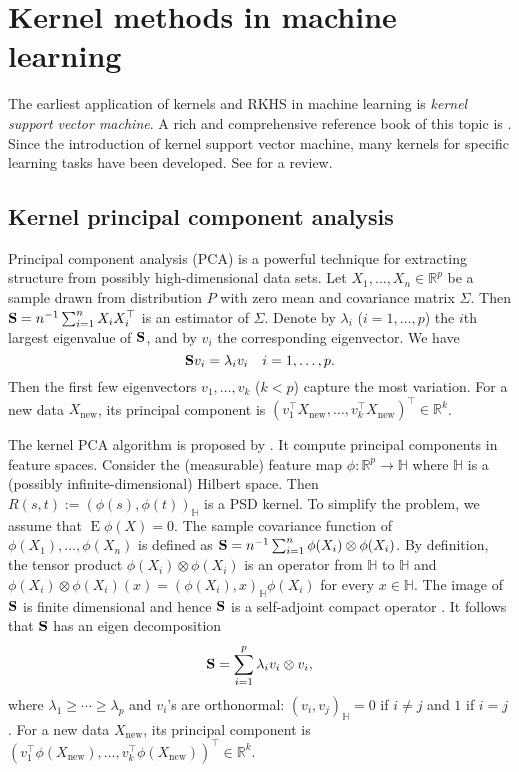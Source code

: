 \documentclass[11pt]{article}
\DeclareMathOperator{\myE}{E}
\theoremstyle{plain}
\theoremstyle{definition}
\theoremstyle{remark}
\begin{document}
\section{Kernel methods in machine learning}
The earliest application of kernels and RKHS in machine learning is \emph{kernel support vector machine}.
A rich and comprehensive reference book of this topic is \cite{book:274797}.
Since the introduction of kernel support vector machine, many kernels for specific learning tasks have been developed.
See \cite{hofmann2008} for a review.
\subsection{Kernel principal component analysis}
Principal component analysis (PCA) is a powerful technique for extracting structure from possibly high-dimensional data sets.
Let $X_1,\ldots,X_n \in \mathbb R^p$ be a sample drawn from distribution $P$ with zero mean and covariance matrix $\Sigma$.
Then $\mathbf{S}=n^{-1}\sum_{i=1}^n X_i X_i^\top$ is an estimator of $\Sigma$.
Denote by $\lambda_i$ ($i=1,\ldots, p$) the $i$th largest eigenvalue of $\mathbf{S}$, and by $v_i$ the corresponding eigenvector.
We have
\begin{equation*}
    \mathbf{S} v_i= \lambda_i v_i\quad i=1,\ldots, p.
\end{equation*}
Then the first few eigenvectors $v_1,\ldots,v_k$ ($k< p$) capture the most variation.
For a new data $X_{\text {new}}$, its principal component is $( v_1^\top X_{\text {new}},\ldots, v_k^\top X_{\text {new}})^\top \in \mathbb R^k$.



The kernel PCA algorithm is proposed by \cite{6790375}.
It compute principal components in feature spaces.
Consider the (measurable) feature map $\phi: \mathbb R^p \to \mathbb H$ where $\mathbb H$ is a (possibly infinite-dimensional) Hilbert space.
Then $R(s,t):=(\phi(s),\phi(t))_{\mathbb H}$ is a PSD kernel.
To simplify the problem, we assume that $\myE \phi(X)=0$.
The sample covariance function of $\phi(X_1),\ldots, \phi(X_n)$ is defined as $\mathbf{S}=n^{-1}\sum_{i=1}^n \phi(X_i) \otimes \phi(X_i)$.
By definition,
the tensor product $\phi(X_i) \otimes \phi(X_i)$ is an operator from $\mathbb H$ to $\mathbb H$ and $\phi(X_i) \otimes \phi(X_i) (x)=(\phi(X_i), x)_{\mathbb H} \phi(X_i)$ for every $x\in \mathbb H$.
The image of $\mathbf{S}$ is finite dimensional and hence $\mathbf{S}$ is a self-adjoint compact operator \cite{book:1323324}.
It follows that $\mathbf{S}$ has an eigen decomposition
\begin{equation*}
    \mathbf{S}=\sum_{i=1}^p \lambda_i v_i \otimes v_i,
\end{equation*}
where $\lambda_1\geq \cdots \geq \lambda_p$ and $v_i$'s are orthonormal: $( v_i, v_j)_{\mathbb H}=0$ if $i\neq j$ and $1$ if $i=j$.
For a new data $X_{\text{new}}$, its principal component is $( v_1^\top \phi(X_{\text {new}}),\ldots, v_k^\top \phi(X_{\text {new}}))^\top \in \mathbb R^k$.
\end{document}
